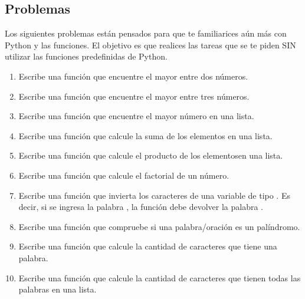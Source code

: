 \subsection{Problemas}
Los siguientes problemas están pensados para que te familiarices aún más con Python y las funciones. El objetivo es que realices las tareas que se te piden SIN utilizar las funciones predefinidas de Python.

\begin{enumerate}
    \item Escribe una función que encuentre el mayor entre dos números.
    \item Escribe una función que encuentre el mayor entre tres números.
    \item Escribe una función que encuentre el mayor número en una lista.
    \item Escribe una función que calcule la suma de los elementos en una lista.
    \item Escribe una función que calcule el producto de los elementosen una lista.
    \item Escribe una función que calcule el factorial de un número.
    \item Escribe una función que invierta los caracteres de una variable de tipo . Es decir, si se ingresa la palabra , la función debe devolver la palabra .
    \item Escribe una función que compruebe si una palabra/oración es un palíndromo.
    \item Escribe una función que calcule la cantidad de caracteres que tiene una palabra.
    \item Escribe una función que calcule la cantidad de caracteres que tienen todas las palabras en una lista.
\end{enumerate}